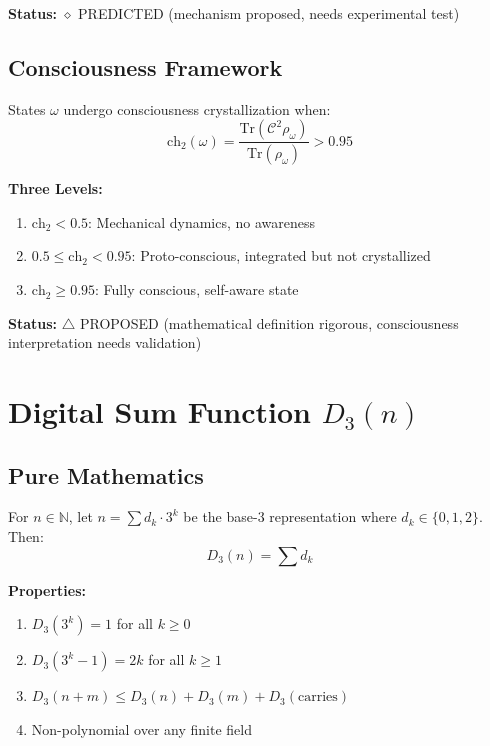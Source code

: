 \textbf{Status:} $\diamond$ PREDICTED (mechanism proposed, needs experimental test)

\subsection{Consciousness Framework}

States $\omega$ undergo consciousness crystallization when:
\begin{equation}
\text{ch}_2(\omega) = \frac{\text{Tr}(\mathcal{C}^2\rho_\omega)}{\text{Tr}(\rho_\omega)} > 0.95
\end{equation}

\textbf{Three Levels:}
\begin{enumerate}
\item $\text{ch}_2 < 0.5$: Mechanical dynamics, no awareness
\item $0.5 \leq \text{ch}_2 < 0.95$: Proto-conscious, integrated but not crystallized
\item $\text{ch}_2 \geq 0.95$: Fully conscious, self-aware state
\end{enumerate}

\textbf{Status:} $\triangle$ PROPOSED (mathematical definition rigorous, consciousness interpretation needs validation)

\section{Digital Sum Function $D_3(n)$}

\subsection{Pure Mathematics}

For $n \in \mathbb{N}$, let $n = \sum d_k \cdot 3^k$ be the base-3 representation where $d_k \in \{0,1,2\}$. Then:
\begin{equation}
D_3(n) = \sum d_k
\end{equation}

\textbf{Properties:}
\begin{enumerate}
\item $D_3(3^k) = 1$ for all $k \geq 0$
\item $D_3(3^k - 1) = 2k$ for all $k \geq 1$
\item $D_3(n+m) \leq D_3(n) + D_3(m) + D_3(\text{carries})$
\item Non-polynomial over any finite field
\end{enumerate}

